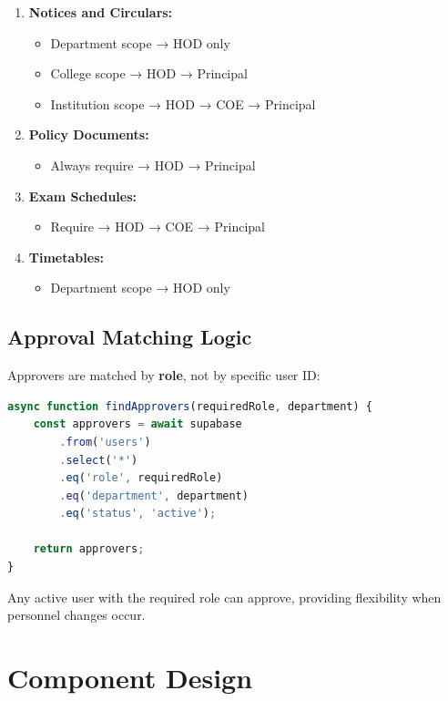 \begin{enumerate}
\item \textbf{Notices and Circulars:}
    \begin{itemize}
    \item Department scope → HOD only
    \item College scope → HOD → Principal
    \item Institution scope → HOD → COE → Principal
    \end{itemize}

\item \textbf{Policy Documents:}
    \begin{itemize}
    \item Always require → HOD → Principal
    \end{itemize}

\item \textbf{Exam Schedules:}
    \begin{itemize}
    \item Require → HOD → COE → Principal
    \end{itemize}

\item \textbf{Timetables:}
    \begin{itemize}
    \item Department scope → HOD only
    \end{itemize}
\end{enumerate}

\subsection{Approval Matching Logic}

Approvers are matched by \textbf{role}, not by specific user ID:

\begin{lstlisting}[language=JavaScript]
async function findApprovers(requiredRole, department) {
    const approvers = await supabase
        .from('users')
        .select('*')
        .eq('role', requiredRole)
        .eq('department', department)
        .eq('status', 'active');
    
    return approvers;
}
\end{lstlisting}

Any active user with the required role can approve, providing flexibility when personnel changes occur.

\section{Component Design}

